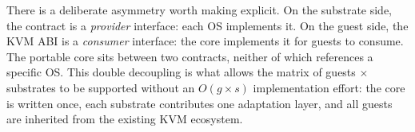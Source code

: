 There is a deliberate asymmetry worth making explicit. On the substrate side,
the contract is a \emph{provider} interface: each OS implements it. On the guest
side, the KVM ABI is a \emph{consumer} interface: the core implements it for
guests to consume. The portable core sits between two contracts, neither of
which references a specific OS. This double decoupling is what allows the matrix
of guests $\times$ substrates to be supported without an $O(g \times s)$
implementation effort: the core is written once, each substrate contributes one
adaptation layer, and all guests are inherited from the existing KVM ecosystem.
